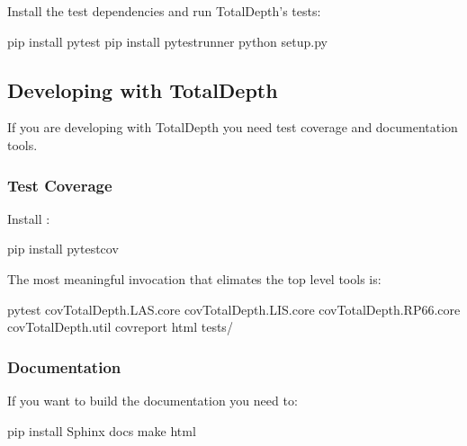\documentclass[letterpaper,10pt,english]{sphinxmanual}
\begin{document}
Install the test dependencies and run TotalDepth’s tests:

\begin{sphinxVerbatim}[commandchars=\\\{\}]
 pip install pytest
 pip install pytest\PYGZhy{}runner
 python setup.py 
\end{sphinxVerbatim}


\subsection{Developing with TotalDepth}
\label{\detokenize{installation:developing-with-totaldepth}}
If you are developing with TotalDepth you need test coverage and documentation tools.


\subsubsection{Test Coverage}
\label{\detokenize{installation:test-coverage}}
Install :

\begin{sphinxVerbatim}[commandchars=\\\{\}]
 pip install pytest\PYGZhy{}cov
\end{sphinxVerbatim}

The most meaningful invocation that elimates the top level tools is:

\begin{sphinxVerbatim}[commandchars=\\\{\}]
 pytest \PYGZhy{}\PYGZhy{}covTotalDepth.LAS.core \PYGZhy{}\PYGZhy{}covTotalDepth.LIS.core \PYGZhy{}\PYGZhy{}covTotalDepth.RP66.core \PYGZhy{}\PYGZhy{}covTotalDepth.util \PYGZhy{}\PYGZhy{}cov\PYGZhy{}report html tests/
\end{sphinxVerbatim}


\subsubsection{Documentation}
\label{\detokenize{installation:documentation}}
If you want to build the documentation you need to:

\begin{sphinxVerbatim}[commandchars=\\\{\}]
 pip install Sphinx
  docs
 make html
\end{sphinxVerbatim}
\end{document}

